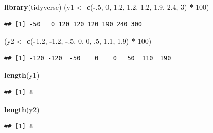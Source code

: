 \documentclass[
]{book}
\newenvironment{Shaded}{\begin{snugshade}}{\end{snugshade}}
\newcommand{\DecValTok}[1]{\textcolor[rgb]{0.00,0.00,0.81}{#1}}
\newcommand{\FloatTok}[1]{\textcolor[rgb]{0.00,0.00,0.81}{#1}}
\newcommand{\FunctionTok}[1]{\textcolor[rgb]{0.13,0.29,0.53}{\textbf{#1}}}
\newcommand{\NormalTok}[1]{#1}
\newcommand{\OtherTok}[1]{\textcolor[rgb]{0.56,0.35,0.01}{#1}}
\newcommand{\SpecialCharTok}[1]{\textcolor[rgb]{0.81,0.36,0.00}{\textbf{#1}}}
\begin{document}
\begin{Shaded}
\begin{Highlighting}[]
\FunctionTok{library}\NormalTok{(tidyverse)}
\NormalTok{(y1 }\OtherTok{\textless{}{-}} \FunctionTok{c}\NormalTok{(}\SpecialCharTok{{-}}\NormalTok{.}\DecValTok{5}\NormalTok{, }\DecValTok{0}\NormalTok{, }\FloatTok{1.2}\NormalTok{, }\FloatTok{1.2}\NormalTok{, }\FloatTok{1.2}\NormalTok{, }\FloatTok{1.9}\NormalTok{, }\FloatTok{2.4}\NormalTok{, }\DecValTok{3}\NormalTok{) }\SpecialCharTok{*} \DecValTok{100}\NormalTok{)}
\end{Highlighting}
\end{Shaded}

\begin{verbatim}
## [1] -50   0 120 120 120 190 240 300
\end{verbatim}

\begin{Shaded}
\begin{Highlighting}[]
\NormalTok{(y2 }\OtherTok{\textless{}{-}} \FunctionTok{c}\NormalTok{(}\SpecialCharTok{{-}}\FloatTok{1.2}\NormalTok{, }\SpecialCharTok{{-}}\FloatTok{1.2}\NormalTok{, }\SpecialCharTok{{-}}\NormalTok{.}\DecValTok{5}\NormalTok{, }\DecValTok{0}\NormalTok{, }\DecValTok{0}\NormalTok{, .}\DecValTok{5}\NormalTok{, }\FloatTok{1.1}\NormalTok{, }\FloatTok{1.9}\NormalTok{) }\SpecialCharTok{*} \DecValTok{100}\NormalTok{)}
\end{Highlighting}
\end{Shaded}

\begin{verbatim}
## [1] -120 -120  -50    0    0   50  110  190
\end{verbatim}

\begin{Shaded}
\begin{Highlighting}[]
\FunctionTok{length}\NormalTok{(y1)}
\end{Highlighting}
\end{Shaded}

\begin{verbatim}
## [1] 8
\end{verbatim}

\begin{Shaded}
\begin{Highlighting}[]
\FunctionTok{length}\NormalTok{(y2)}
\end{Highlighting}
\end{Shaded}

\begin{verbatim}
## [1] 8
\end{verbatim}
\end{document}
